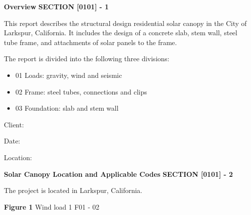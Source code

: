 \documentclass[12pt,notitle,letterpaper]{report}
\newenvironment{DUlineblock}[1]{%
    \list{}{\setlength{\partopsep}{\parskip}
            \addtolength{\partopsep}{\baselineskip}
            \setlength{\topsep}{0pt}
            \setlength{\itemsep}{0.15\baselineskip}
            \setlength{\parsep}{0pt}
            \setlength{\leftmargin}{#1}}
    \raggedright
  }
  {\endlist}
\begin{document}
\setcounter{page}{7}

\makeatletter
\renewcommand\@dotsep{10000}\makeatother


\vspace{.2in}   \textbf{Overview}   \hfill\textbf{SECTION [0101] - 1}
\newline   \vspace{.05in}   {\color{black}\hrulefill}

This report describes the structural design residential solar canopy in
the City of Larkspur, California. It includes the design of a concrete
slab, stem wall, steel tube frame, and attachments of solar panels to the
frame.

The report is divided into the following three divisions:

\begin{itemize}
\item 01 Loads: gravity, wind and seismic

\item 02 Frame: steel tubes, connections and clips

\item 03 Foundation: slab and stem wall
\end{itemize}

Client:

Date:

Location:

\pagebreak

\vspace{.2in}   \textbf{Solar Canopy Location and Applicable Codes}   \hfill\textbf{SECTION [0101] - 2}
\newline   \vspace{.05in}   {\color{black}\hrulefill}

The project is located in Larkspur, California.

\noindent{}

\begin{DUlineblock}{0em}
\item[] 
\end{DUlineblock}

\textbf{Figure 1} Wind load 1 \hfill F01 - 02

\noindent{}

\begin{DUlineblock}{0em}
\item[] 
\end{DUlineblock}
\end{document}
